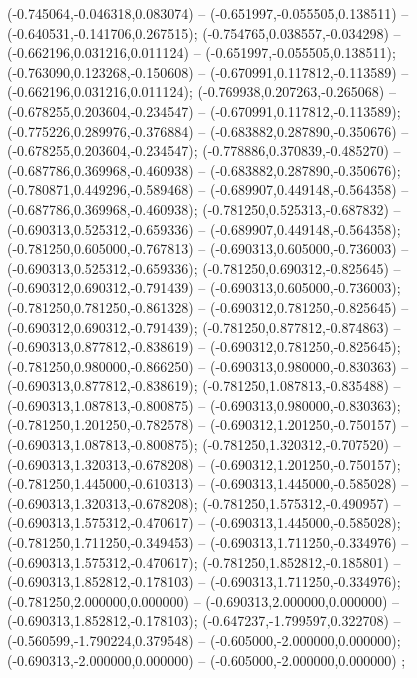  (-0.745064,-0.046318,0.083074) -- (-0.651997,-0.055505,0.138511) -- (-0.640531,-0.141706,0.267515);
 (-0.754765,0.038557,-0.034298) -- (-0.662196,0.031216,0.011124) -- (-0.651997,-0.055505,0.138511);
 (-0.763090,0.123268,-0.150608) -- (-0.670991,0.117812,-0.113589) -- (-0.662196,0.031216,0.011124);
 (-0.769938,0.207263,-0.265068) -- (-0.678255,0.203604,-0.234547) -- (-0.670991,0.117812,-0.113589);
 (-0.775226,0.289976,-0.376884) -- (-0.683882,0.287890,-0.350676) -- (-0.678255,0.203604,-0.234547);
 (-0.778886,0.370839,-0.485270) -- (-0.687786,0.369968,-0.460938) -- (-0.683882,0.287890,-0.350676);
 (-0.780871,0.449296,-0.589468) -- (-0.689907,0.449148,-0.564358) -- (-0.687786,0.369968,-0.460938);
 (-0.781250,0.525313,-0.687832) -- (-0.690313,0.525312,-0.659336) -- (-0.689907,0.449148,-0.564358);
 (-0.781250,0.605000,-0.767813) -- (-0.690313,0.605000,-0.736003) -- (-0.690313,0.525312,-0.659336);
 (-0.781250,0.690312,-0.825645) -- (-0.690312,0.690312,-0.791439) -- (-0.690313,0.605000,-0.736003);
 (-0.781250,0.781250,-0.861328) -- (-0.690312,0.781250,-0.825645) -- (-0.690312,0.690312,-0.791439);
 (-0.781250,0.877812,-0.874863) -- (-0.690313,0.877812,-0.838619) -- (-0.690312,0.781250,-0.825645);
 (-0.781250,0.980000,-0.866250) -- (-0.690313,0.980000,-0.830363) -- (-0.690313,0.877812,-0.838619);
 (-0.781250,1.087813,-0.835488) -- (-0.690313,1.087813,-0.800875) -- (-0.690313,0.980000,-0.830363);
 (-0.781250,1.201250,-0.782578) -- (-0.690312,1.201250,-0.750157) -- (-0.690313,1.087813,-0.800875);
 (-0.781250,1.320312,-0.707520) -- (-0.690313,1.320313,-0.678208) -- (-0.690312,1.201250,-0.750157);
 (-0.781250,1.445000,-0.610313) -- (-0.690313,1.445000,-0.585028) -- (-0.690313,1.320313,-0.678208);
 (-0.781250,1.575312,-0.490957) -- (-0.690313,1.575312,-0.470617) -- (-0.690313,1.445000,-0.585028);
 (-0.781250,1.711250,-0.349453) -- (-0.690313,1.711250,-0.334976) -- (-0.690313,1.575312,-0.470617);
 (-0.781250,1.852812,-0.185801) -- (-0.690313,1.852812,-0.178103) -- (-0.690313,1.711250,-0.334976);
 (-0.781250,2.000000,0.000000) -- (-0.690313,2.000000,0.000000) -- (-0.690313,1.852812,-0.178103);
 (-0.647237,-1.799597,0.322708) -- (-0.560599,-1.790224,0.379548) -- (-0.605000,-2.000000,0.000000);
 (-0.690313,-2.000000,0.000000) -- (-0.605000,-2.000000,0.000000) ;
